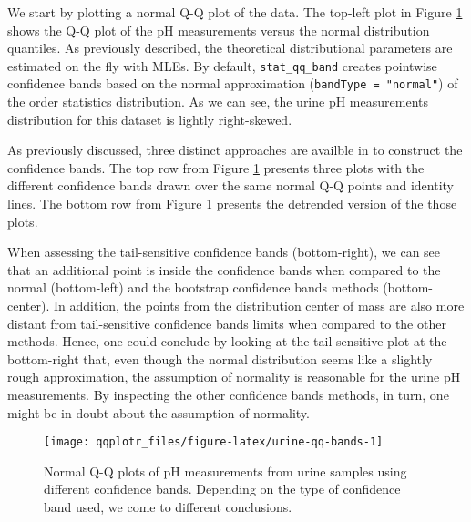 We start by plotting a normal Q-Q plot of the data. The top-left plot in
Figure \ref{fig:urine-qq-bands} shows the Q-Q plot of the pH
measurements versus the normal distribution quantiles. As previously
described, the theoretical distributional parameters are estimated on
the fly with MLEs. By default, \texttt{stat\_qq\_band} creates pointwise
confidence bands based on the normal approximation
(\texttt{bandType\ =\ "normal"}) of the order statistics distribution.
As we can see, the urine pH measurements distribution for this dataset
is lightly right-skewed.

As previously discussed, three distinct approaches are availble in
 to construct the confidence bands. The top row from Figure
\ref{fig:urine-qq-bands} presents three plots with the different
confidence bands drawn over the same normal Q-Q points and identity
lines. The bottom row from Figure \ref{fig:urine-qq-bands} presents the
detrended version of the those plots.


When assessing the tail-sensitive confidence bands (bottom-right), we
can see that an additional point is inside the confidence bands when
compared to the normal (bottom-left) and the bootstrap confidence bands
methods (bottom-center). In addition, the points from the distribution
center of mass are also more distant from tail-sensitive confidence
bands limits when compared to the other methods. Hence, one could
conclude by looking at the tail-sensitive plot at the bottom-right that,
even though the normal distribution seems like a slightly rough
approximation, the assumption of normality is reasonable for the urine
pH measurements. By inspecting the other confidence bands methods, in
turn, one might be in doubt about the assumption of normality.

\begin{Schunk}
\begin{figure}

{\centering \texttt{[image: qqplotr\_files/figure-latex/urine-qq-bands-1]} 

}

\caption{Normal Q-Q plots of pH measurements from urine samples using different confidence bands. Depending on the type of confidence band used, we come to different conclusions. }\label{fig:urine-qq-bands}
\end{figure}
\end{Schunk}

